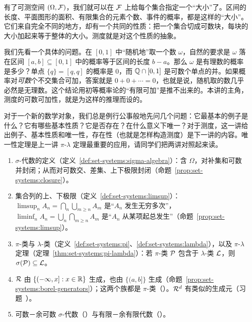 \label{lec:measures}

有了可测空间 $(\Omega,\mathcal{F})$，我们就可以在 $\mathcal{F}$ 上给每个集合指定一个“大小”了。区间的长度、平面图形的面积、有限集合的元素个数、事件的概率，都是这样的“大小”。它们来自完全不同的地方，却有一个共同的性质：把一个集合切成可数块，每块的大小加起来等于整体的大小。测度就是对这个性质的抽象。

我们先看一个具体的问题。在 $[0,1]$ 中“随机地”取一个数 $\omega$，自然的要求是 $\omega$ 落在区间 $[a,b]\subseteq[0,1]$ 中的概率等于区间的长度 $b-a$。那么 $\omega$ 是有理数的概率是多少？单点 $\{q\}=[q,q]$ 的概率是 $0$，而 $\mathbb{Q}\cap[0,1]$ 是可数个单点的并。如果概率对\emph{可数}个不交集合可加，答案就是 $0+0+\cdots=0$，也就是说，随机取的数几乎必然是无理数。这个结论用初等概率论的“有限可加”是推不出来的。本讲的主角，测度的可数可加性，就是为这样的推理而设的。

对于一个新的数学对象，我们总是例行公事般地先问几个问题：它最基本的例子是什么？它有哪些基本性质？它是否存在？在什么意义下唯一？对于测度，这一讲给出例子、基本性质和唯一性，存在性（也就是怎样构造测度）是下一讲的内容。唯一性定理是上一讲 $\pi$-$\lambda$ 定理最重要的应用，请同学们把两讲对照起来读。


\begin{enumerate}
\item $\sigma$-代数的定义（定义~\ref{def:set-systems:sigma-algebra}）：含 $\Omega$，对补集和可数并封闭；从而对可数交、差集、上下极限封闭（命题~\ref{prop:set-systems:closure}）。
\item 集合列的上、下极限（定义~\ref{def:set-systems:limsup}）：$\limsup_nA_n=\bigcap_n\bigcup_{m\geqslant n}A_m$ 是“$A_n$ 发生无穷多次”，$\liminf_nA_n=\bigcup_n\bigcap_{m\geqslant n}A_m$ 是“$A_n$ 从某项起总发生”（命题~\ref{prop:set-systems:limsup}）。
\item $\pi$-类与 $\lambda$-类（定义~\ref{def:set-systems:pi}、\ref{def:set-systems:lambda}），以及 $\pi$-$\lambda$ 定理（定理~\ref{thm:set-systems:pi-lambda}）：若 $\pi$-类 $\mathcal{P}$ 包含于 $\lambda$-类 $\mathcal{L}$，则 $\sigma(\mathcal{P})\subseteq\mathcal{L}$。
\item $\mathcal{R}$ 由 $\{(-\infty,x]:x\in\mathbb{R}\}$ 生成，也由 $\{(a,b]\}$ 生成（命题~\ref{prop:set-systems:borel-generators}）；这两个族都是 $\pi$-类（）。$\mathcal{R}^d$ 有类似的生成元（习题~）。
\item 可数－余可数 $\sigma$-代数（）与有限－余有限代数（）。
\end{enumerate}

